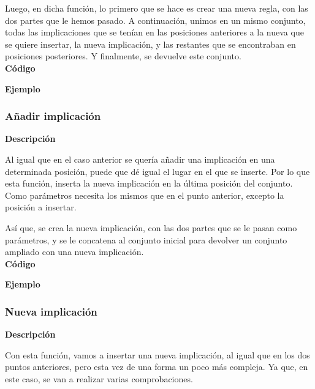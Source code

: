     Luego, en dicha funci\'on, lo primero que se hace es crear una nueva regla, con las dos partes que le hemos pasado. A continuaci\'on, 
    unimos en un mismo conjunto, todas las implicaciones que se ten\'ian en las posiciones anteriores a la nueva que se quiere insertar, 
    la nueva implicaci\'on, y las restantes que se encontraban en posiciones posteriores. Y finalmente, se devuelve este conjunto.
    \\


    \textbf{C\'odigo}

    

    \textbf{Ejemplo}



\subsubsection{A\~nadir implicaci\'on}

    \textbf{Descripci\'on}

    Al igual que en el caso anterior se quer\'ia a\~nadir una implicaci\'on en una determinada posici\'on, puede que d\'e igual 
    el lugar en el que se inserte. Por lo que esta funci\'on, inserta la nueva implicaci\'on en la \'ultima posici\'on del 
    conjunto. Como par\'ametros necesita los mismos que en el punto anterior, excepto la posici\'on a insertar.

    As\'i que, se crea la nueva implicaci\'on, con las dos partes que se le pasan como par\'ametros, y se le concatena al conjunto 
    inicial para devolver un conjunto ampliado con una nueva implicaci\'on.
    \\


    \textbf{C\'odigo}

    


    \textbf{Ejemplo}



\subsubsection{Nueva implicaci\'on}

    \textbf{Descripci\'on}

    Con esta funci\'on, vamos a insertar una nueva implicaci\'on, al igual que en los dos puntos anteriores, pero esta vez 
    de una forma un poco m\'as compleja. Ya que, en este caso, se van a realizar varias comprobaciones.

